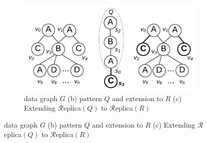 \begin{figure}
\vspace{-0.20in}
	\begin{subfigure}[b]{0.5\textwidth}
		\centering
		\includegraphics[scale=0.4]{img_ex/approx-new.pdf}\hspace*{2.5em}
		\caption{data graph $G$ (b) pattern $Q$ and extension to $R$ (c)
		Extending $\mathcal{R}$eplica$(Q)$ to $\mathcal{R}$eplica$(R)$}%
		\label{fig:exactq}
	\end{subfigure}%

\end{figure}
